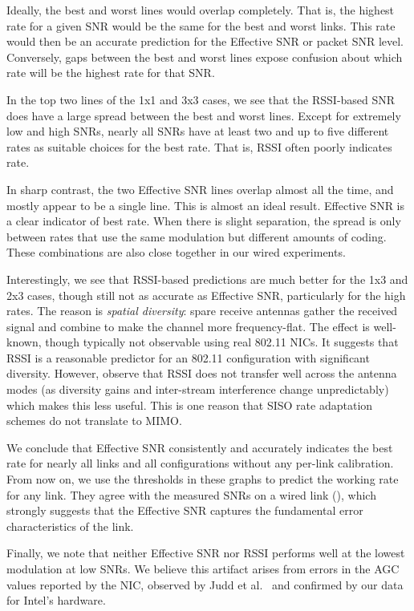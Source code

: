 Ideally, the best and worst lines would overlap completely. %
That is, the highest rate for a given SNR would be the same for the best and worst links. This rate would then be an accurate prediction for the Effective SNR or packet SNR level. Conversely, gaps between the best and worst lines expose confusion about which rate will be the highest rate for that SNR\@.

In the top two lines of the 1x1 and 3x3 cases, we see that the RSSI-based SNR does have a large spread between the best and worst lines. Except for extremely low and high SNRs, nearly all SNRs have at least two and up to five different rates as suitable choices for the best rate. That is, RSSI often poorly indicates rate.

In sharp contrast, %
the two Effective SNR lines overlap almost all the time, and mostly appear to be a single line. This is almost an ideal result. Effective SNR is a clear indicator of best rate. When there is slight separation, the spread is only between rates that use the same modulation but different amounts of coding. These combinations are also close together in our wired experiments. 

Interestingly, we see that RSSI-based predictions are much better for the 1x3 and 2x3 cases, though still not as accurate as Effective SNR, particularly for the high rates. The reason is \emph{spatial diversity}: spare receive antennas gather the received signal and combine to make the channel more frequency-flat. The effect is well-known, though typically not observable using real 802.11 NICs. It suggests that RSSI is a reasonable predictor for an 802.11 configuration with significant diversity. However, observe that RSSI does not transfer well across the antenna modes (as diversity gains and inter-stream interference change unpredictably) which makes this less useful. This is one reason that SISO rate adaptation schemes do not translate to MIMO\@.

We conclude that Effective SNR consistently and accurately indicates the best rate for nearly all links and all configurations without any per-link calibration. From now on, we use the thresholds in these graphs to predict the working rate for any link. They agree with the measured SNRs on a wired link (), which strongly suggests that the Effective SNR captures the fundamental error characteristics of the link. 

Finally, we note that neither Effective SNR nor RSSI performs well at the lowest modulation at low SNRs. We believe this artifact arises from errors in the AGC values reported by the NIC, observed by Judd et al.~\cite{judd_rate_adapt} and confirmed by our data for Intel's hardware.


